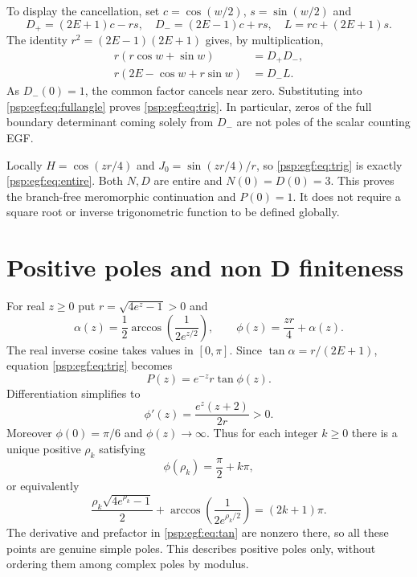 \documentclass[11pt,letterpaper]{article}
\numberwithin{equation}{section}
\theoremstyle{remark}\newtheorem{remark}[theorem]{Remark}
\begin{document}
To display the cancellation, set $c=\cos(w/2)$, $s=\sin(w/2)$ and
\[
 D_+=(2E+1)c-rs,\quad D_-=(2E-1)c+rs,\quad L=rc+(2E+1)s.
\]
The identity $r^2=(2E-1)(2E+1)$ gives, by multiplication,
\begin{align}
 r(r\cos w+\sin w)&=D_+D_-,\label{psp:egf:eq:factor1}\\
 r(2E-\cos w+r\sin w)&=D_-L.\label{psp:egf:eq:factor2}
\end{align}
As $D_-(0)=1$, the common factor cancels near zero. Substituting into
\eqref{psp:egf:eq:fullangle} proves \eqref{psp:egf:eq:trig}. In particular, zeros of the
full boundary determinant coming solely from $D_-$ are not poles of the
scalar counting EGF.

Locally $H=\cos(zr/4)$ and $J_0=\sin(zr/4)/r$, so \eqref{psp:egf:eq:trig}
is exactly \eqref{psp:egf:eq:entire}. Both $N,D$ are entire and $N(0)=D(0)=3$.
This proves the branch-free meromorphic continuation and $P(0)=1$.
It does not require a square root or inverse trigonometric function to
be defined globally.

\section{Positive poles and non D finiteness}\label{psp:egf:sec:positive}
For real $z\geq0$ put $r=\sqrt{4e^z-1}>0$ and
\begin{equation}\label{psp:egf:eq:phase}
 \alpha(z)=\frac12\arccos\!\left(\frac1{2e^{z/2}}\right),\qquad
 \phi(z)=\frac{zr}{4}+\alpha(z).
\end{equation}
The real inverse cosine takes values in $[0,\pi]$.
Since $\tan\alpha=r/(2E+1)$, equation \eqref{psp:egf:eq:trig} becomes
\begin{equation}\label{psp:egf:eq:tan}
 P(z)=e^{-z}r\tan\phi(z).
\end{equation}
Differentiation simplifies to
\begin{equation}\label{psp:egf:eq:phiprime}
 \phi'(z)=\frac{e^z(z+2)}{2r}>0.
\end{equation}
Moreover $\phi(0)=\pi/6$ and $\phi(z)\to\infty$. Thus for each
integer $k\geq0$ there is a unique positive $\rho_k$ satisfying
\begin{equation}\label{psp:egf:eq:realpoles}
 \phi(\rho_k)=\frac\pi2+k\pi,
\end{equation}
or equivalently
\[
 \frac{\rho_k\sqrt{4e^{\rho_k}-1}}2+
 \arccos\!\left(\frac1{2e^{\rho_k/2}}\right)=(2k+1)\pi.
\]
The derivative and prefactor in \eqref{psp:egf:eq:tan} are nonzero there, so all
these points are genuine simple poles. This describes positive poles
only, without ordering them among complex poles by modulus.
\end{document}

